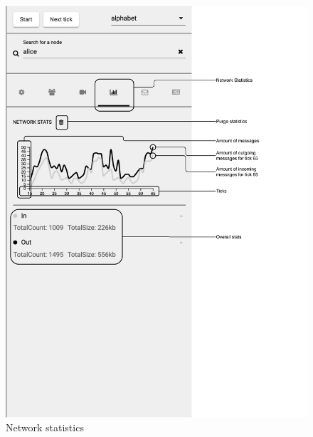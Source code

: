 \begin{figure}
\centering
\includegraphics[width=1\textwidth]{graphics/analysis-tools/visualisation-sidebar-network-stats.pdf}
\caption{Network statistics}
\label{fig:anl-sim-network-stats}
\end{figure}

